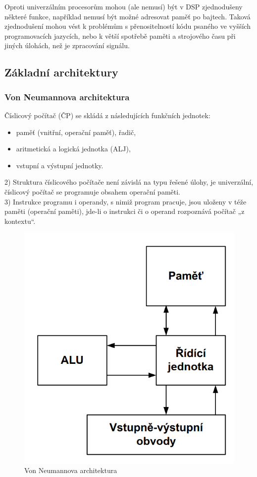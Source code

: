 Oproti univerzálním procesorům mohou (ale nemusí) být v DSP zjednodušeny některé funkce, například nemusí být možné adresovat paměť po bajtech. Taková zjednodušení mohou vést k problémům s přenositelností kódu psaného ve vyšších programovacích jazycích, nebo k větší spotřebě paměti a strojového času při jiných úlohách, než je zpracování signálu.
 
\subsection{Základní architektury}
\subsubsection{Von Neumannova architektura}
Číslicový počítač (ČP) se skládá z následujících funkčních
jednotek:
\begin{itemize}
\item paměť (vnitřní, operační paměť), řadič,
\item aritmetická a logická jednotka (ALJ),
\item vstupní a výstupní jednotky.
\end{itemize}
2) Struktura číslicového počítače není závislá na typu řešené
úlohy, je univerzální, číslicový počítač se programuje
obsahem operační paměti.\\
3) Instrukce programu i operandy, s nimiž program pracuje,
jsou uloženy v téže paměti (operační paměti), jde-li o
instrukci či o operand rozpoznává počítač „z kontextu“.\\
    \begin{figure}[h]
   \begin{center}
     \includegraphics[scale=0.4]{images/VON.png}
   \end{center}
   \caption{Von Neumannova architektura}
  \end{figure}
  
